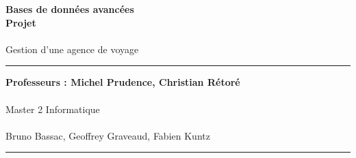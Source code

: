 \documentclass[a4paper]{article}
\newlength{\larg}
\begin{document}
\thispagestyle{empty}

\setlength{\unitlength}{1in}


\begin{flushright}
 \noindent {\rule{\larg}{0.5mm}}
\end{flushright}
\vspace{7mm}
\begin{flushright}
 \Huge{\bf Bases de données avancées} \\
 \Huge{\bf Projet} \\
 ~\\
 \huge{Gestion d'une agence de voyage}\\
\end{flushright}
\vspace{7mm}
\begin{flushright}
 {\rule{\larg}{0.5mm}}
\end{flushright}
\vspace{2mm}
\begin{flushright}
 \large{\bf Professeurs : Michel Prudence, Christian Rétoré} \\
 ~\\
 \large{Master 2 Informatique}\\
 ~\\
 \vspace{9cm}
 \large{Bruno Bassac, Geoffrey Graveaud, Fabien Kuntz}
{\rule{\larg}{0.5mm}}
\end{flushright}

\newpage

\addtolength{\oddsidemargin}{1cm}

\thispagestyle{empty}
\tableofcontents
\newpage

\setcounter{page}{1}



% 

\end{document}
